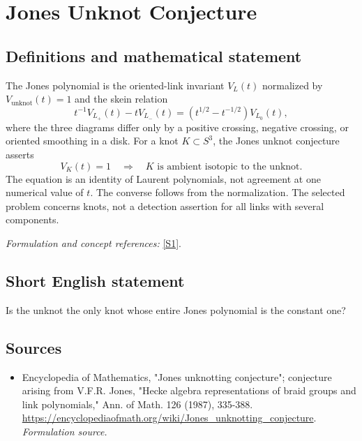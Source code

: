 \documentclass[11pt]{article}
\begin{document}
\section*{\texorpdfstring{Jones Unknot Conjecture}{Jones Unknot Conjecture}}\label{339}
\subsection{Definitions and mathematical statement}
The Jones polynomial is the oriented-link invariant $V_L(t)$ normalized by $V_{\mathrm{unknot}}(t)=1$ and the skein relation
\[
 t^{-1}V_{L_+}(t)-tV_{L_-}(t)
 =(t^{1/2}-t^{-1/2})V_{L_0}(t),
\]
where the three diagrams differ only by a positive crossing, negative crossing, or oriented smoothing in a disk. For a knot $K\subset S^3$, the Jones unknot conjecture asserts
\[
 V_K(t)=1\quad\Longrightarrow\quad K\text{ is ambient isotopic to the unknot}.
\]
The equation is an identity of Laurent polynomials, not agreement at one numerical value of $t$. The converse follows from the normalization. The selected problem concerns knots, not a detection assertion for all links with several components.
\par\smallskip\textit{Formulation and concept references:} \href{https://encyclopediaofmath.org/wiki/Jones_unknotting_conjecture}{[S1]}.

\subsection{Short English statement}
Is the unknot the only knot whose entire Jones polynomial is the constant one?
\subsection{Sources}
\begin{itemize}
\item[S1]Encyclopedia of Mathematics, "Jones unknotting conjecture"; conjecture arising from V.F.R. Jones, "Hecke algebra representations of braid groups and link polynomials," Ann. of Math. 126 (1987), 335-388.
\url{https://encyclopediaofmath.org/wiki/Jones_unknotting_conjecture}.
\textit{Formulation source.}
\end{itemize}
\end{document}
